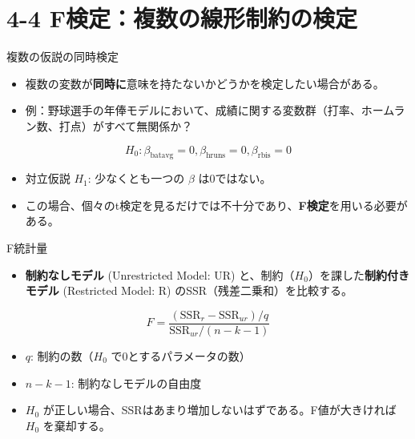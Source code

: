 \documentclass[
  ignorenonframetext,
]{beamer}
\providecommand{\tightlist}{%
  \setlength{\itemsep}{0pt}\setlength{\parskip}{0pt}}
\begin{document}
\section{4-4
F検定：複数の線形制約の検定}\label{fux691cux5b9aux8907ux6570ux306eux7ddaux5f62ux5236ux7d04ux306eux691cux5b9a}

\begin{frame}{複数の仮説の同時検定}
\label{ux8907ux6570ux306eux4eeeux8aacux306eux540cux6642ux691cux5b9a}
\begin{itemize}
\tightlist
\item
  複数の変数が\textbf{同時に}意味を持たないかどうかを検定したい場合がある。
\item
  例：野球選手の年俸モデルにおいて、成績に関する変数群（打率、ホームラン数、打点）がすべて無関係か？
\end{itemize}

\[ H_0: \beta_{\text{batavg}} = 0, \beta_{\text{hruns}} = 0, \beta_{\text{rbis}} = 0 \]

\begin{itemize}
\tightlist
\item
  対立仮説 \(H_1\): 少なくとも一つの \(\beta\) は0ではない。
\item
  この場合、個々のt検定を見るだけでは不十分であり、\textbf{F検定}を用いる必要がある。
\end{itemize}
\end{frame}

\begin{frame}{F統計量}
\label{fux7d71ux8a08ux91cf}
\begin{itemize}
\tightlist
\item
  \textbf{制約なしモデル} (Unrestricted Model: UR)
  と、制約（\(H_0\)）を課した\textbf{制約付きモデル} (Restricted Model:
  R) のSSR（残差二乗和）を比較する。
\end{itemize}

\[ F = \frac{(\text{SSR}_r - \text{SSR}_{ur}) / q}{\text{SSR}_{ur} / (n - k - 1)} \]

\begin{itemize}
\tightlist
\item
  \(q\): 制約の数（\(H_0\) で0とするパラメータの数）
\item
  \(n-k-1\): 制約なしモデルの自由度
\item
  \(H_0\) が正しい場合、SSRはあまり増加しないはずである。F値が大きければ
  \(H_0\) を棄却する。
\end{itemize}
\end{frame}
\end{document}
